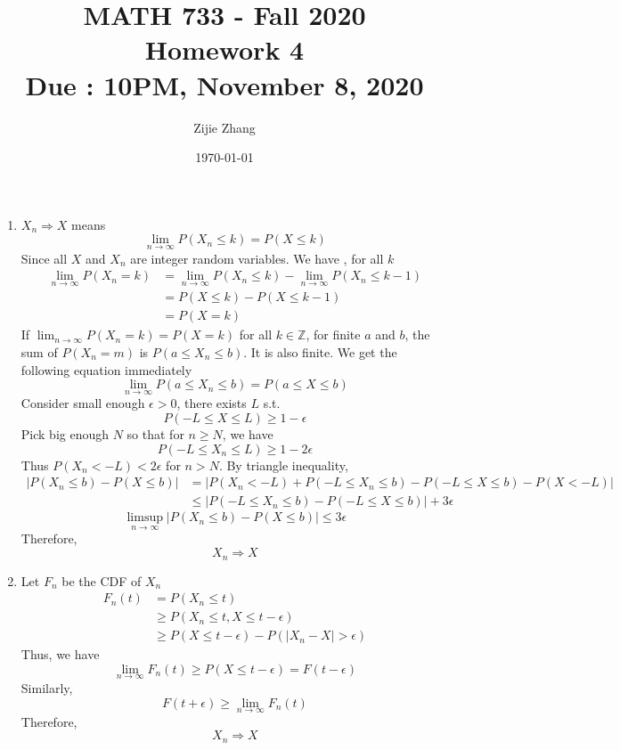 \documentclass{article}
\title{MATH 733 - Fall 2020\\
		{\Large \textbf{Homework 4}}\\
		{\normalsize \textbf{Due : 10PM, November 8, 2020}}
	}
\author{Zijie Zhang}
\date{\today}
\begin{document}
	\maketitle

	\begin{enumerate}
		\item $X_n \Rightarrow X$ means
			$$\lim_{n\to\infty} P(X_n \leqslant k) = P(X \leqslant k)$$
			Since all $X$ and $X_n$ are integer random variables. We have , for all $k$\begin{align*}
				\lim_{n\to\infty}P(X_n = k) 
				& = \lim_{n\to\infty} P(X_n \leqslant k) - \lim_{n\to\infty} P(X_n \leqslant k-1)\\
				& = P(X \leqslant k) - P(X \leqslant k-1)\\
				& = P(X = k)
			\end{align*}
		If $\lim_{n\to\infty} P(X_n=k) = P(X=k)$ for all $k\in\mathbb{Z}$, for finite $a$ and $b$, the sum of $P(X_n = m)$ is $P(a\leqslant X_n \leqslant b)$. It is also finite. We get the following equation immediately
		$$\lim_{n\to\infty}P(a\leqslant X_n \leqslant b) = P(a \leqslant X \leqslant b)$$
		Consider small enough $\epsilon > 0$, there exists $L$ s.t. $$P(-L \leqslant X \leqslant L) \geqslant 1-\epsilon$$
		Pick big enough $N$ so that for $n \geqslant N$, we have $$P(-L \leqslant X_n \leqslant L) \geqslant 1-2\epsilon$$
		Thus $P(X_n < -L) < 2\epsilon$ for $n > N$. By triangle inequality, \begin{align*}
			|P(X_n \leqslant b) - P(X \leqslant b)|
			& = |P(X_n < -L) + P(-L \leqslant X_n \leqslant b) - P(-L \leqslant X \leqslant b) - P(X < -L) |\\
			& \leqslant |P(-L \leqslant X_n \leqslant b) - P(-L \leqslant X \leqslant b)| + 3\epsilon
		\end{align*}
		$$\limsup_{n\to\infty} |P(X_n \leqslant b) - P(X \leqslant b)| \leqslant 3 \epsilon$$
		Therefore, $$X_n \Rightarrow X$$

		\item Let $F_n$ be the CDF of $X_n$
			\begin{align*}
				F_n(t)
				& = P(X_n \leqslant t)\\
				& \geqslant P(X_n \leqslant t, X \leqslant t- \epsilon)\\
				& \geqslant P(X \leqslant t - \epsilon) - P(|X_n - X|>\epsilon)
			\end{align*}
		Thus, we have $$\lim_{n\to\infty} F_n(t) \geqslant P(X \leqslant t - \epsilon) = F(t-\epsilon)$$
		Similarly, $$F(t+\epsilon) \geqslant \lim_{n\to\infty} F_n(t) $$
		Therefore,  $$X_n \Rightarrow X$$


\end{enumerate}
\end{document}
